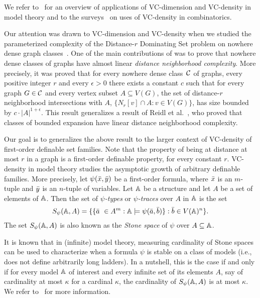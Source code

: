 We refer to~\cite{aschenbrenner2016vapnik} for an overview of 
applications of VC-dimension and VC-density in model
theory and to the surveys~\cite{furedi1991traces,matouvsek1998geometric} 
on uses of VC-density in
combinatorics. 

Our attention was drawn to VC-dimension and 
VC-density when we studied the parameterized 
complexity of the {\sc Distance-$r$ Dominating Set} 
problem on nowhere dense graph classes~\cite{eickmeyer2016neighborhood}. 
One of the main contributions of \cite{eickmeyer2016neighborhood}
was to prove that nowhere dense classes of graphs have almost linear
\emph{distance neighborhood complexity}. More precisely, it
was proved that for every nowhere dense class~$\mathcal{C}$ of 
graphs, every positive integer $r$ and every $\epsilon>0$ there
exists a constant $c$ such that for every graph $G\in\mathcal{C}$ and
every vertex subset $A\subseteq V(G)$, the set of distance-$r$ neighborhood intersections with $A$,
$\{N_r[v]\cap A \colon v\in V(G)\}$,
has size bounded by $c\cdot |A|^{1+\epsilon}$. This result
generalizes a result of Reidl et al.~\cite{reidl2016characterising}, who proved that classes of bounded expansion have linear distance neighborhood complexity. 

Our goal is to generalizes the above result to the larger context of VC-density of first-order definable set families.
Note that the property of being at distance at most $r$ in a graph is 
a first-order definable property, for every constant $r$.
VC-density in model theory studies the asymptotic growth 
of arbitrary definable families. More precisely, 
let $\psi(\bar{x},\bar{y})$ be a first-order formula, where 
$\bar{x}$ is an $m$-tuple and $\bar{y}$ is an $n$-tuple of variables. 
Let $\mathbb{A}$ be a structure and let $A$ be a set of elements of
$\mathbb{A}$. Then the set of \emph{$\psi$-types} or 
\emph{$\psi$-traces} over $A$ in 
$\mathbb{A}$ is the set
\[S_\psi(\mathbb{A},A)=\{\{\bar{a}\ \in A^m : \mathbb{A}\models\psi(\bar{a},\bar{b})\} : \bar{b}\in V(\mathbb{A})^n\}.\]
The set $S_\psi(\mathbb{A},A)$ is also known as the {\em{Stone space}} of $\psi$ over $A\subseteq \mathbb{A}$.

It is known that in (infinite) model theory,
measuring cardinality of Stone spaces can be used to characterize when a formula $\psi$ is stable on a class of models (i.e., does not define arbitrarily long ladders).
In a nutshell, this is the case if and only if for every model $\mathbb{A}$ of interest and every infinite set of its elements $A$, say of cardinality at most $\kappa$ for a cardinal $\kappa$,
the cardinality of $S_\psi(\mathbb{A},A)$ is at most $\kappa$. We refer to~\cite{} for more information.

